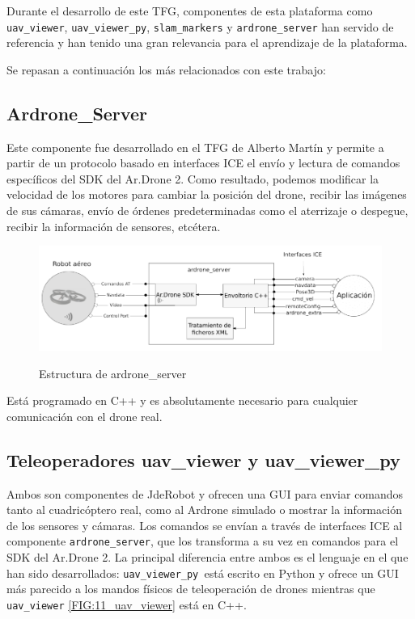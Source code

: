{	Durante el desarrollo de este TFG, componentes de esta plataforma como \texttt{uav\_viewer}, \texttt{uav\_viewer\_py}, \texttt{slam\_markers} y \texttt{ardrone\_server} han servido de referencia y han tenido una gran relevancia para el aprendizaje de la plataforma.
	
	Se repasan a continuación los más relacionados con este trabajo:
	
	\subsection{Ardrone\_Server}
	
	Este componente fue desarrollado en el TFG de Alberto  Martín \cite{AlbertoMartin} y permite a partir de un protocolo basado en interfaces ICE el envío y lectura de comandos específicos del SDK del Ar.Drone 2.
	Como resultado, podemos modificar la velocidad de los motores para cambiar la posición del drone, recibir las imágenes de sus cámaras, envío de órdenes predeterminadas como el aterrizaje o despegue, recibir la información de sensores, etcétera.
	
	\begin{figure}[H]
		\centering
		{\includegraphics[scale=0.4]{imag/ardrone_server_structure.png}}
		\caption{Estructura de ardrone\_server}
		
		\label{FIG:32_ardrone_server}
	\end{figure}
	
	Está programado en C++ y es absolutamente necesario para cualquier comunicación con el drone real.
	
	
	
	\subsection{Teleoperadores uav\_viewer y uav\_viewer\_py} \label{subsec:uavviewer}
	
	Ambos son componentes de JdeRobot y ofrecen una GUI para enviar comandos tanto al cuadricóptero real, como al Ardrone simulado o mostrar la información de los sensores y cámaras. 
	Los comandos se envían a través de interfaces ICE al componente \texttt{ardrone\_server}, que los transforma a su vez en comandos para el SDK del Ar.Drone 2. La principal diferencia entre ambos es el lenguaje en el que han sido desarrollados: \texttt{uav\_viewer\_py  }está escrito en Python y ofrece un GUI más parecido a los mandos físicos de teleoperación de drones mientras que \texttt{uav\_viewer} \ref{FIG:11_uav_viewer} está en C++.
	
}
